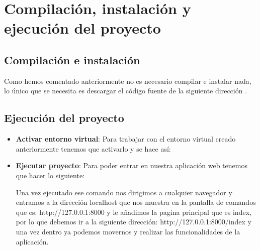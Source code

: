 \section{Compilación, instalación y ejecución del proyecto}

\subsection{Compilación e instalación}

Como hemos comentado anteriormente no es necesario compilar e instalar nada, lo único que se necesita es descargar el código fuente de la siguiente dirección \cite{Repositorio}.

\subsection{Ejecución del proyecto}

\begin{itemize}
	\item \textbf{Activar entorno virtual}: Para trabajar con el entorno virtual creado anteriormente tenemos que activarlo y se hace así:
	
	\item \textbf{Ejecutar proyecto}: Para poder entrar en nuestra aplicación web tenemos que hacer lo siguiente:
	
	Una vez ejecutado ese comando nos dirigimos a cualquier navegador y entramos a la dirección localhost que nos muestra en la pantalla de comandos que es: http://127.0.0.1:8000 y le añadimos la pagina principal que es index, por lo que debemos ir a la siguiente dirección: http://127.0.0.1:8000/index y una vez dentro ya podemos movernos y realizar las funcionalidades de la aplicación.
\end{itemize}
